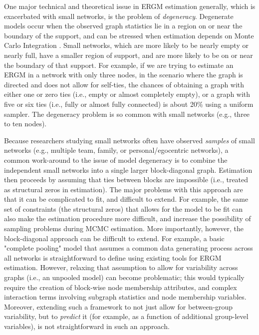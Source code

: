 \documentclass[12pt]{article}
\begin{document}
One major technical and theoretical issue in ERGM estimation generally, which is exacerbated with small networks, is the problem of \textit{degeneracy}. Degenerate models occur when the observed graph statistics lie in a region on or near the boundary of the support, and can be stressed when estimation depends on Monte Carlo Integration \cite{Strauss1986,Handcock2003}. Small networks, which are more likely to be nearly empty or nearly full, have a smaller region of support, and are more likely to be on or near the boundary of that support. For example, if we are trying to estimate an ERGM in a network with only three nodes, in the scenario where the graph is directed and does not allow for self-ties, the chances of obtaining a graph with either one or zero ties (i.e., empty or almost completely empty), or a graph with five or six ties (i.e., fully or almost fully connected) is about 20\% using a uniform sampler. The degeneracy problem is so common with small networks (e.g., three to ten nodes). 

Because researchers studying small networks often have observed \textit{samples} of small networks (e.g., multiple team, family, or personal/egocentric networks), a common work-around to the issue of model degeneracy is to combine the independent small networks into a single larger block-diagonal graph. Estimation then proceeds by assuming that ties between blocks are impossible (i.e., treated as structural zeros in estimation). The major problems with this approach are that it can be complicated to fit, and difficult to extend. For example, the same set of constraints (the structural zeros) that allows for the model to be fit can also make the estimation procedure more difficult, and increase the possibility of sampling problems during MCMC estimation. More importantly, however, the block-diagonal approach can be difficult to extend. For example, a basic "complete pooling" model that assumes a common data generating process across all networks is straightforward to define using existing tools for ERGM estimation. However, relaxing that assumption to allow for variability across graphs (i.e., an unpooled model) can become problematic; this would typically require the creation of block-wise node membership attributes, and complex interaction terms involving subgraph statistics and node membership variables. Moreover, extending such a framework to not just allow for between-group variability, but to \textit{predict} it (for example, as a function of additional group-level variables), is not straightforward in such an approach.
\end{document}
